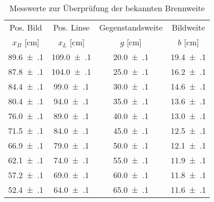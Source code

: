 \begin{table}[!h]
	\centering
	\begin{tabular}{|c|c|c|c|}
		\hline
		Pos. Bild & Pos. Linse & Gegenstandsweite & Bildweite\\
		$x_{B}$ [\si{\centi\meter}] & $x_{L}$ [\si{\centi\meter}] & $g$ [\si{\centi\meter}] & $b$ [\si{\centi\meter}]\\
\hline\hline
		\num{89.6(1)} & \num{109.0(1)} & \num{20.0(1)} & \num{19.4(1)}\\
		\num{87.8(1)} & \num{104.0(1)} & \num{25.0(1)} & \num{16.2(1)}\\
		\num{84.4(1)} & \num{99.0(1)} & \num{30.0(1)} & \num{14.6(1)}\\
		\num{80.4(1)} & \num{94.0(1)} & \num{35.0(1)} & \num{13.6(1)}\\
		\num{76.0(1)} & \num{89.0(1)} & \num{40.0(1)} & \num{13.0(1)}\\
		\num{71.5(1)} & \num{84.0(1)} & \num{45.0(1)} & \num{12.5(1)}\\
		\num{66.9(1)} & \num{79.0(1)} & \num{50.0(1)} & \num{12.1(1)}\\
		\num{62.1(1)} & \num{74.0(1)} & \num{55.0(1)} & \num{11.9(1)}\\
		\num{57.2(1)} & \num{69.0(1)} & \num{60.0(1)} & \num{11.8(1)}\\
		\num{52.4(1)} & \num{64.0(1)} & \num{65.0(1)} & \num{11.6(1)}\\
		\hline
	\end{tabular}
	\caption{Messwerte zur Überprüfung der bekannten Brennweite \label{tab:Auswertung_Messwerte_I}}
\end{table}
